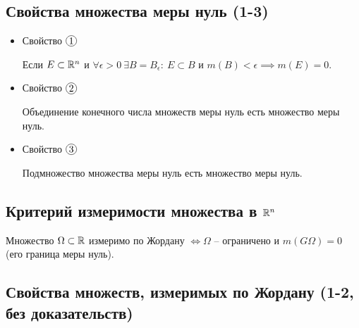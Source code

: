\subsection{Свойства множества меры нуль (1-3)}

\begin{itemize}
    \item Свойство $ \circled{1} $
          \begin{statement}
              Если $ E \subset \mathbb{R}^n $ и $ \forall \epsilon > 0 \ \exists B = B_\epsilon: \ E \subset B $ и $ m(B) < \epsilon \implies m(E) = 0 $.
          \end{statement}

    \item Свойство $ \circled{2} $
          \begin{statement}
              Объединение конечного числа множеств меры нуль есть множество меры нуль.
          \end{statement}

    \item Свойство $ \circled{3} $
          \begin{statement}
              Подмножество множества меры нуль есть множество меры нуль.
          \end{statement}
\end{itemize}

\subsection{Критерий измеримости множества в $\mathbb{R}^n$}

\begin{theorem}
    Множество $ \Omega \subset \mathbb{R} $ измеримо по Жордану $ \iff \Omega $ -- ограничено и $ m(G\Omega) = 0 $ (его граница меры нуль).
\end{theorem}

\subsection{Свойства множеств, измеримых по Жордану (1-2, без доказательств)}

